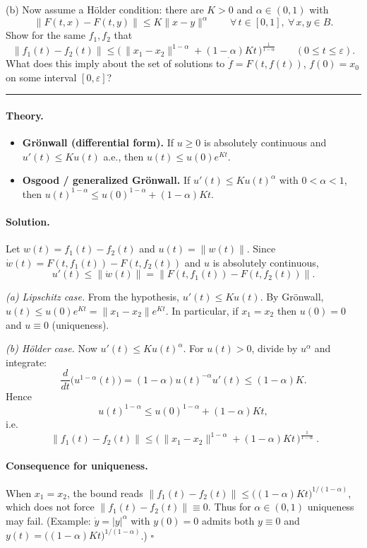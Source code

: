 \documentclass[12pt,a4paper]{article}
\newcommand{\qed}{\hfill$\square$}
\theoremstyle{plain}
\theoremstyle{definition}
\theoremstyle{remark}
\theoremstyle{remark}
\begin{document}
(b) Now assume a Hölder condition: there are $K>0$ and $\alpha\in(0,1)$ with
\[
\|F(t,x)-F(t,y)\|\le K\|x-y\|^\alpha\qquad \forall\,t\in[0,1],\ \forall\,x,y\in B.
\]
Show for the same $f_1,f_2$ that
\[
\|f_1(t)-f_2(t)\|
\le \Big(\,\|x_1-x_2\|^{1-\alpha}+(1-\alpha)Kt\,\Big)^{\frac{1}{1-\alpha}}
\qquad (0\le t\le\varepsilon).
\]
What does this imply about the set of solutions to
$\dot f=F(t,f(t))$, $f(0)=x_0$ on some interval $[0,\varepsilon]$?

\bigskip
\hrule
\bigskip

\paragraph{Theory.}
\begin{itemize}\setlength{\itemsep}{6pt}
	\item \textbf{Grönwall (differential form).} If $u\ge0$ is absolutely continuous and
	$u'(t)\le Ku(t)$ a.e., then $u(t)\le u(0)e^{Kt}$.
	\item \textbf{Osgood / generalized Grönwall.} If $u'(t)\le Ku(t)^\alpha$ with
	$0<\alpha<1$, then
	$u(t)^{1-\alpha}\le u(0)^{1-\alpha}+(1-\alpha)Kt$.
\end{itemize}

\bigskip

\paragraph{Solution.}
Let $w(t)=f_1(t)-f_2(t)$ and $u(t)=\|w(t)\|$.
Since $\dot w(t)=F(t,f_1(t))-F(t,f_2(t))$ and $u$ is absolutely continuous,
\[
u'(t)\le \|\dot w(t)\|=\|F(t,f_1(t))-F(t,f_2(t))\|.
\]

\emph{(a) Lipschitz case.}
From the hypothesis, $u'(t)\le Ku(t)$.
By Grönwall, $u(t)\le u(0)e^{Kt}=\|x_1-x_2\|e^{Kt}$.
In particular, if $x_1=x_2$ then $u(0)=0$ and $u\equiv0$ (uniqueness).

\emph{(b) Hölder case.}
Now $u'(t)\le K u(t)^\alpha$.
For $u(t)>0$, divide by $u^\alpha$ and integrate:
\[
\frac{d}{dt}\big(u^{1-\alpha}(t)\big)=(1-\alpha)u(t)^{-\alpha}u'(t)
\le (1-\alpha)K.
\]
Hence
\[
u(t)^{1-\alpha}\le u(0)^{1-\alpha}+(1-\alpha)Kt,
\]
i.e.
\[
\boxed{\ \|f_1(t)-f_2(t)\|
	\le \Big(\,\|x_1-x_2\|^{1-\alpha}+(1-\alpha)Kt\,\Big)^{\frac{1}{1-\alpha}} \ }.
\]

\paragraph{Consequence for uniqueness.}
When $x_1=x_2$, the bound reads
$\|f_1(t)-f_2(t)\|\le\big((1-\alpha)Kt\big)^{1/(1-\alpha)}$, which does not force
$\|f_1(t)-f_2(t)\|\equiv0$. Thus for $\alpha\in(0,1)$ uniqueness may fail.
(Example: $\dot y=|y|^\alpha$ with $y(0)=0$ admits both $y\equiv0$ and
$y(t)=\big((1-\alpha)Kt\big)^{1/(1-\alpha)}$.)
\qed
\end{document}
